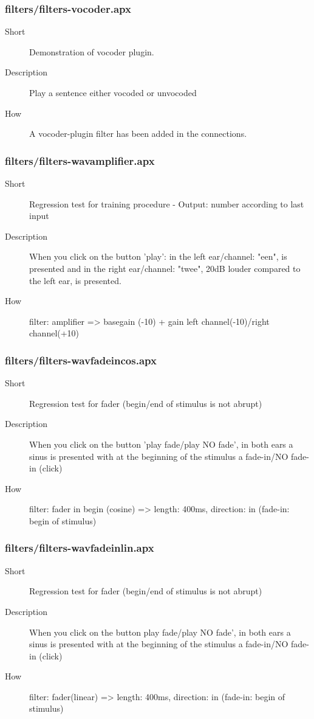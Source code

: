 \subsubsection{filters/filters-vocoder.apx}
\begin{description}
\item[Short] 
 Demonstration of vocoder plugin.
\item[Description] 
 Play a sentence either vocoded or unvocoded
\item[How] 
 A vocoder-plugin filter has been added in the connections.
\end{description}

\subsubsection{filters/filters-wavamplifier.apx}
\begin{description}
\item[Short] 
 Regression test for training procedure - Output: number according to last input
\item[Description] 
 When you click on the button 'play': in the left ear/channel: "een", is presented and in the right ear/channel: "twee", 20dB louder compared to the left ear, is presented.
\item[How] 
 filter: amplifier =\textgreater{} basegain (-10) + gain left channel(-10)/right channel(+10)
\end{description}

\subsubsection{filters/filters-wavfadeincos.apx}
\begin{description}
\item[Short] 
 Regression test for fader (begin/end of stimulus is not abrupt)
\item[Description] 
 When you click on the button 'play fade/play NO fade', in both ears a sinus is presented with at the beginning of the stimulus a fade-in/NO fade-in (click)
\item[How] 
 filter: fader in begin (cosine) =\textgreater{} length: 400ms, direction: in (fade-in: begin of stimulus)
\end{description}

\subsubsection{filters/filters-wavfadeinlin.apx}
\begin{description}
\item[Short] 
 Regression test for fader (begin/end of stimulus is not abrupt)
\item[Description] 
 When you click on the button play fade/play NO fade', in both ears a sinus is presented with at the beginning of the stimulus a fade-in/NO fade-in (click)
\item[How] 
 filter: fader(linear) =\textgreater{} length: 400ms, direction: in (fade-in: begin of stimulus)
\end{description}

